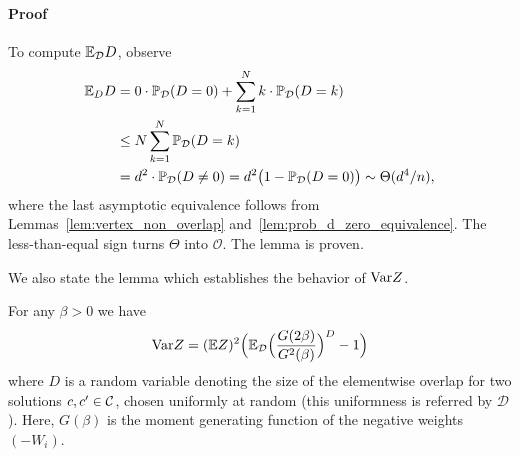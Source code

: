 \paragraph{Proof} 
To compute $\mathbb{E}_{\cal D} D$,  observe
\begin{align}
  \mathbb{E}_D D &= 0 \cdot {\mathbb{P}}_{\cal D}(D = 0) + \sum_{k=1}^N k \cdot {\mathbb{P}}_{\cal D}(D = k) \notag \\
    &\le N \sum_{k=1}^N {\mathbb{P}}_{\cal D}(D = k) \notag \\
    &= d^2 \cdot {\mathbb{P}}_{\cal D}(D \ne 0) = d^2 \bigl(1 - {\mathbb{P}}_{\cal D}(D = 0)\bigr) 
      \sim \Theta(d^4/n),
\end{align}
where the last asymptotic equivalence follows from
Lemmas~\ref{lem:vertex_non_overlap} and~\ref{lem:prob_d_zero_equivalence}. 
The less-than-equal sign turns $\Theta$ into $\mathcal{O}$. The lemma is proven.
\QEDA
\par
\medskip

We also state the lemma which establishes the behavior of ${\mathrm{Var}} Z$.

\begin{lemma}%
\label{lemma:variance_z}
For any $\beta>0$ we have
\begin{equation}
\label{eq-var}
{\mathrm{Var}} Z = (\mathbb{E} Z)^2 \Bigl( \mathbb{E}_{\cal D} 
    \Bigl( \frac{G(2\beta)}{G^2(\beta)} \Bigr)^D - 1 \Bigr)
\end{equation}
where $D$ is a  random variable denoting the size of the elementwise overlap for
two solutions $c,c'\in {\cal C}$, chosen uniformly at random (this uniformness is 
referred by $\mathcal{D}$). Here, $G(\beta)$ is the
moment generating function of the negative weights $(-W_i)$. 
\end{lemma}
\parsec
